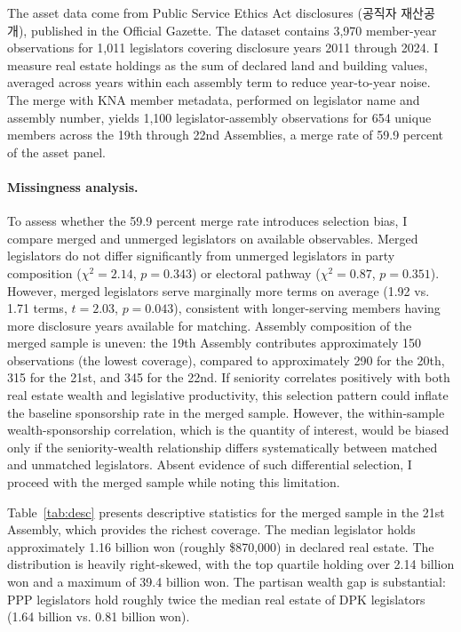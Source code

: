 \documentclass[11pt]{article}
\begin{document}
The asset data come from Public Service Ethics Act disclosures (공직자 재산공개), published in the Official Gazette. The dataset contains 3,970 member-year observations for 1,011 legislators covering disclosure years 2011 through 2024. I measure real estate holdings as the sum of declared land and building values, averaged across years within each assembly term to reduce year-to-year noise. The merge with KNA member metadata, performed on legislator name and assembly number, yields 1,100 legislator-assembly observations for 654 unique members across the 19th through 22nd Assemblies, a merge rate of 59.9 percent of the asset panel.

\paragraph{Missingness analysis.} To assess whether the 59.9 percent merge rate introduces selection bias, I compare merged and unmerged legislators on available observables. Merged legislators do not differ significantly from unmerged legislators in party composition ($\chi^2 = 2.14$, $p = 0.343$) or electoral pathway ($\chi^2 = 0.87$, $p = 0.351$). However, merged legislators serve marginally more terms on average (1.92 vs. 1.71 terms, $t = 2.03$, $p = 0.043$), consistent with longer-serving members having more disclosure years available for matching. Assembly composition of the merged sample is uneven: the 19th Assembly contributes approximately 150 observations (the lowest coverage), compared to approximately 290 for the 20th, 315 for the 21st, and 345 for the 22nd. If seniority correlates positively with both real estate wealth and legislative productivity, this selection pattern could inflate the baseline sponsorship rate in the merged sample. However, the within-sample wealth-sponsorship correlation, which is the quantity of interest, would be biased only if the seniority-wealth relationship differs systematically between matched and unmatched legislators. Absent evidence of such differential selection, I proceed with the merged sample while noting this limitation.

Table~\ref{tab:desc} presents descriptive statistics for the merged sample in the 21st Assembly, which provides the richest coverage. The median legislator holds approximately 1.16 billion won (roughly \$870,000) in declared real estate. The distribution is heavily right-skewed, with the top quartile holding over 2.14 billion won and a maximum of 39.4 billion won. The partisan wealth gap is substantial: PPP legislators hold roughly twice the median real estate of DPK legislators (1.64 billion vs. 0.81 billion won).
\end{document}
